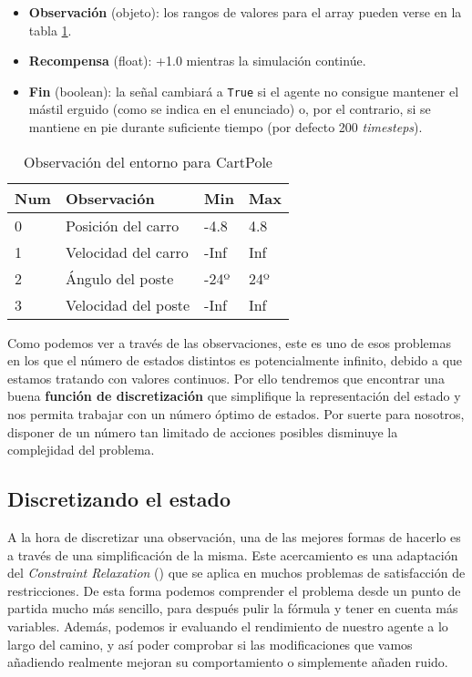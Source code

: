 \begin{itemize}
    \item \textbf{Observación} (objeto): los rangos de valores para el array pueden verse en la tabla \ref{obs-cartpole}.
    \item \textbf{Recompensa} (float): +1.0 mientras la simulación continúe.
    \item \textbf{Fin} (boolean): la señal cambiará a \texttt{True} si el agente no consigue mantener el mástil erguido (como se indica en el enunciado) o, por el contrario, si se mantiene en pie durante suficiente tiempo (por defecto 200 \textit{timesteps}).
\end{itemize}
\begin{table}[]
    \centering
    \begin{tabular}{|l|l|l|l|}
    \hline
    \textbf{Num} & \textbf{Observación} & \textbf{Min} & \textbf{Max} \\ \hline
    0            & Posición del carro   & -4.8         & 4.8          \\ \hline
    1            & Velocidad del carro  & -Inf         & Inf          \\ \hline
    2            & Ángulo del poste     & -24º         & 24º          \\ \hline
    3            & Velocidad del poste  & -Inf         & Inf          \\ \hline
    \end{tabular}
    \caption{Observación del entorno para CartPole}
    \label{obs-cartpole}
\end{table}

Como podemos ver a través de las observaciones, este es uno de esos problemas en los que el número de estados distintos es potencialmente infinito, debido a que estamos tratando con valores continuos. Por ello tendremos que encontrar una buena \textbf{función de discretización} que simplifique la representación del estado y nos permita trabajar con un número óptimo de estados. Por suerte para nosotros, disponer de un número tan limitado de acciones posibles disminuye la complejidad del problema.


\subsection{Discretizando el estado}
\label{sec:disc}

A la hora de discretizar una observación, una de las mejores formas de hacerlo es a través de una simplificación de la misma. Este acercamiento es una adaptación del \textit{Constraint Relaxation} (\citet{rardin1998optimization}) que se aplica en muchos problemas de satisfacción de restricciones. De esta forma podemos comprender el problema desde un punto de partida mucho más sencillo, para después pulir la fórmula y tener en cuenta más variables. Además, podemos ir evaluando el rendimiento de nuestro agente a lo largo del camino, y así poder comprobar si las modificaciones que vamos añadiendo realmente mejoran su comportamiento o simplemente añaden ruido.

